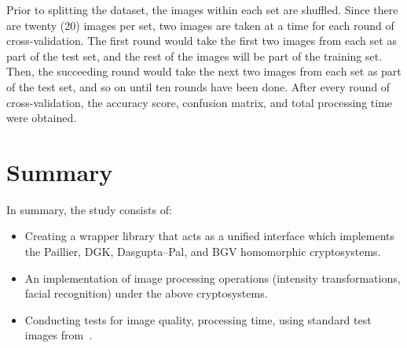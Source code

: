 Prior to splitting the dataset, the images within each set are shuffled. Since there are twenty (20) images per set, two images are taken at a time for each round of cross-validation. The first round would take the first two images from each set as part of the test set, and the rest of the images will be part of the training set. Then, the succeeding round would take the next two images from each set as part of the test set, and so on until ten rounds have been done. After every round of cross-validation, the accuracy score, confusion matrix, and total processing time were obtained. 

\section{Summary}
In summary, the study consists of:
\begin{itemize}
	\item Creating a wrapper library that acts as a unified interface which implements the Paillier, DGK, Dasgupta--Pal, and BGV homomorphic cryptosystems.
	\item An implementation of image processing operations (intensity transformations, facial recognition) under the above cryptosystems.
	\item Conducting tests for image quality, processing time, using standard test images from~\cite{gonzalez_image_nodate}.
\end{itemize}

